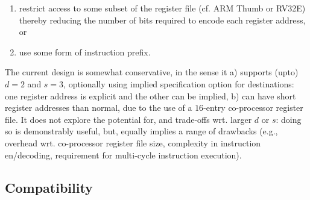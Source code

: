 \documentclass{article}
\begin{document}
\begin{itemize}
      \begin{enumerate}
      \item restrict access to some subset of the register file 
            (cf. ARM Thumb or RV32E) 
            thereby reducing the number of bits required to encode each  
            register address,
            or
      \item use some form of instruction prefix.
      \end{enumerate}
      
      \noindent
      The current design is somewhat conservative, in the sense it 
      a) supports (upto) $d = 2$ and $s = 3$, 
         optionally using implied specification option for destinations: 
         one register address is explicit and the other can be implied,
      b) can have short register addresses than normal, due to the use
         of a $16$-entry co-processor register file.
      It does not explore the potential for, and trade-offs wrt. larger 
      $d$ or $s$: doing so is demonstrably useful, but, equally implies
      a range of drawbacks (e.g., overhead wrt. co-processor register 
      file size, complexity in instruction en/decoding, requirement for
      multi-cycle instruction execution).

\end{itemize}


\subsection*{Compatibility}
\end{document}
